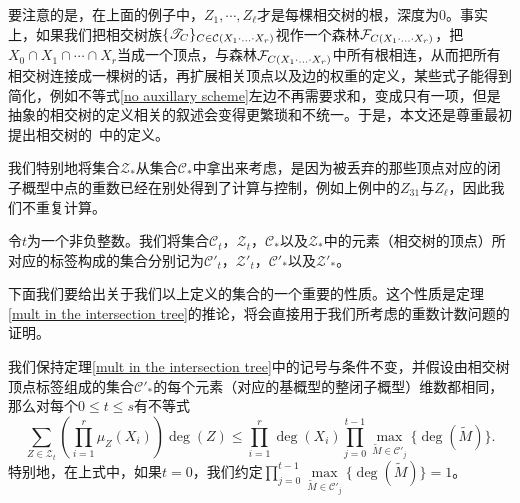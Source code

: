 \begin{remark}
要注意的是，在上面的例子中，$Z_1,\cdots,Z_{\ell}$才是每棵相交树的根，深度为$0$。事实上，如果我们把相交树族$\{\mathscr T_C\}_{C\in\mathcal C(X_1\cdot\ldots\cdot X_r)}$视作一个森林$\mathcal{F}_{C(X_1\cdot\ldots\cdot X_r)}$，把$X_0\cap X_1\cap\cdots\cap X_r$当成一个顶点，与森林$\mathcal{F}_{C(X_1\cdot\ldots\cdot X_r)}$中所有根相连，从而把所有相交树连接成一棵树的话，再扩展相关顶点以及边的权重的定义，某些式子能得到简化，例如不等式\eqref{no auxillary scheme}左边不再需要求和，变成只有一项，但是抽象的相交树的定义相关的叙述会变得更繁琐和不统一。于是，本文还是尊重最初提出相交树的~中的定义。
\end{remark}

\begin{remark}
我们特别地将集合$\mathcal Z_*$从集合$\mathcal C_*$中拿出来考虑，是因为被丢弃的那些顶点对应的闭子概型中点的重数已经在别处得到了计算与控制，例如上例中的$Z_{31}$与$Z_{\ell}$，因此我们不重复计算。
\end{remark}

\begin{definition}
令$t$为一个非负整数。我们将集合$\mathcal C_t$，$\mathcal Z_t$，$\mathcal C_*$以及$\mathcal Z_*$中的元素（相交树的顶点）所对应的标签构成的集合分别记为$\mathcal C'_t$，$\mathcal Z'_t$，$\mathcal C'_*$以及$\mathcal Z'_*$。
\end{definition}

下面我们要给出关于我们以上定义的集合的一个重要的性质。这个性质是定理\ref{mult in the intersection tree}的推论，将会直接用于我们所考虑的重数计数问题的证明。

\begin{proposition} \label{grassmanne}
我们保持定理\ref{mult in the intersection tree}中的记号与条件不变，并假设由相交树顶点标签组成的集合$\mathcal C'_*$的每个元素（对应的基概型的整闭子概型）维数都相同，那么对每个$0\leqslant t \leqslant s$有不等式
\begin{equation} \label{relation of multiplicity and degree}
\sum_{Z\in \mathcal Z_t} \left(\prod_{i=1}^r\mu_Z(X_i)\right)\deg(Z) \leqslant \prod_{i=1}^r\deg(X_i)\prod_{j=0}^{t-1}\max_{\widetilde{M}\in \mathcal C'_j}\{\deg(\widetilde{M})\}.
\end{equation}
特别地，在上式中，如果$t=0$，我们约定$\prod\limits_{j=0}^{t-1} \max\limits_{\widetilde{M}\in \mathcal C'_j} \{\deg(\widetilde{M})\} = 1$。
\end{proposition}

